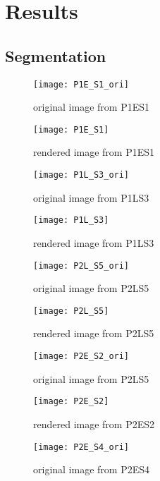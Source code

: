 
\section{Results}
\subsection{Segmentation}


\begin{figure}[h]
	\texttt{[image: P1E\_S1\_ori]}
	\caption{original image from P1ES1}
	\label{fig:original image from P1LS1}
\end{figure}

\begin{figure}[h]
	\texttt{[image: P1E\_S1]}
	\caption{rendered image from P1ES1}
	\label{fig:rendered image from P1LS1}
\end{figure}

\begin{figure}[h]
	\texttt{[image: P1L\_S3\_ori]}
	\caption{original image from P1LS3}
	\label{fig:original image from P1LS3}
\end{figure}

\begin{figure}[h]
	\texttt{[image: P1L\_S3]}
	\caption{rendered image from P1LS3}
	\label{fig:rendered image from P1LS3}
	
\end{figure}

\begin{figure}[h]
	\texttt{[image: P2L\_S5\_ori]}
	\caption{original image from P2LS5}
	\label{fig:original image from P2LS5}
\end{figure}

\begin{figure}[h]
	\texttt{[image: P2L\_S5]}
	\caption{rendered image from P2LS5}
	\label{fig:rendered image from P2LS5}
\end{figure}

\begin{figure}[h]
	\texttt{[image: P2E\_S2\_ori]}
	\caption{original image from P2LS5}
	\label{fig:original image from P2LS5}
\end{figure}

\begin{figure}[h]
	\texttt{[image: P2E\_S2]}
	\caption{rendered image from P2ES2}
	\label{fig:rendered image from P2ES2}
\end{figure}

\begin{figure}[h]
	\texttt{[image: P2E\_S4\_ori]}
	\caption{original image from P2ES4}
	\label{fig:original image from P2ES4}
\end{figure}

